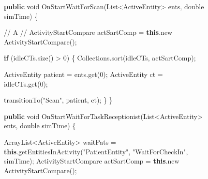 \documentclass[
  10pt,
  a4paperpaper,
  DIV=11,
  numbers=noendperiod,
  oneside]{scrreprt}
\newenvironment{Shaded}{\begin{snugshade}}{\end{snugshade}}
\newcommand{\BuiltInTok}[1]{\textcolor[rgb]{0.00,0.23,0.31}{#1}}
\newcommand{\CommentTok}[1]{\textcolor[rgb]{0.37,0.37,0.37}{#1}}
\newcommand{\ControlFlowTok}[1]{\textcolor[rgb]{0.00,0.23,0.31}{\textbf{#1}}}
\newcommand{\DataTypeTok}[1]{\textcolor[rgb]{0.68,0.00,0.00}{#1}}
\newcommand{\DecValTok}[1]{\textcolor[rgb]{0.68,0.00,0.00}{#1}}
\newcommand{\FunctionTok}[1]{\textcolor[rgb]{0.28,0.35,0.67}{#1}}
\newcommand{\KeywordTok}[1]{\textcolor[rgb]{0.00,0.23,0.31}{\textbf{#1}}}
\newcommand{\NormalTok}[1]{\textcolor[rgb]{0.00,0.23,0.31}{#1}}
\newcommand{\OperatorTok}[1]{\textcolor[rgb]{0.37,0.37,0.37}{#1}}
\newcommand{\StringTok}[1]{\textcolor[rgb]{0.13,0.47,0.30}{#1}}
\begin{document}
\begin{figure}

\begin{codebox}

\begin{Shaded}
\begin{Highlighting}[numbers=left,,]
\KeywordTok{public} \DataTypeTok{void} \FunctionTok{OnStartWaitForScan}\OperatorTok{(}\BuiltInTok{List}\OperatorTok{\textless{}}\NormalTok{ActiveEntity}\OperatorTok{\textgreater{}}\NormalTok{ ents}\OperatorTok{,} \DataTypeTok{double}\NormalTok{ simTime}\OperatorTok{)} \OperatorTok{\{}
  
    \CommentTok{// A //}
\NormalTok{    ActivityStartCompare actSartComp }\OperatorTok{=} \KeywordTok{this}\OperatorTok{.}\FunctionTok{new} \FunctionTok{ActivityStartCompare}\OperatorTok{();}        
    
    \ControlFlowTok{if} \OperatorTok{(}\NormalTok{idleCTs}\OperatorTok{.}\FunctionTok{size}\OperatorTok{()} \OperatorTok{\textgreater{}} \DecValTok{0}\OperatorTok{)} \OperatorTok{\{}
      \BuiltInTok{Collections}\OperatorTok{.}\FunctionTok{sort}\OperatorTok{(}\NormalTok{idleCTs}\OperatorTok{,}\NormalTok{ actSartComp}\OperatorTok{);}
      
\NormalTok{      ActiveEntity patient }\OperatorTok{=}\NormalTok{ ents}\OperatorTok{.}\FunctionTok{get}\OperatorTok{(}\DecValTok{0}\OperatorTok{);}
\NormalTok{      ActiveEntity ct }\OperatorTok{=}\NormalTok{ idleCTs}\OperatorTok{.}\FunctionTok{get}\OperatorTok{(}\DecValTok{0}\OperatorTok{);}

      \FunctionTok{transitionTo}\OperatorTok{(}\StringTok{"Scan"}\OperatorTok{,}\NormalTok{ patient}\OperatorTok{,}\NormalTok{ ct}\OperatorTok{);}
    \OperatorTok{\}}
  \OperatorTok{\}}
    
\KeywordTok{public} \DataTypeTok{void} \FunctionTok{OnStartWaitForTaskReceptionist}\OperatorTok{(}\BuiltInTok{List}\OperatorTok{\textless{}}\NormalTok{ActiveEntity}\OperatorTok{\textgreater{}}\NormalTok{ ents}\OperatorTok{,} \DataTypeTok{double}\NormalTok{ simTime}\OperatorTok{)} \OperatorTok{\{}
      
  \BuiltInTok{ArrayList}\OperatorTok{\textless{}}\NormalTok{ActiveEntity}\OperatorTok{\textgreater{}}\NormalTok{ waitPats }\OperatorTok{=} \KeywordTok{this}\OperatorTok{.}\FunctionTok{getEntitiesInActivity}\OperatorTok{(}\StringTok{"PatientEntity"}\OperatorTok{,} \StringTok{"WaitForCheckIn"}\OperatorTok{,}\NormalTok{ simTime}\OperatorTok{);}
\NormalTok{  ActivityStartCompare actSartComp }\OperatorTok{=} \KeywordTok{this}\OperatorTok{.}\FunctionTok{new} \FunctionTok{ActivityStartCompare}\OperatorTok{();}
  

\end{Highlighting}
\end{Shaded}
\end{codebox}
\end{figure}
\end{document}
